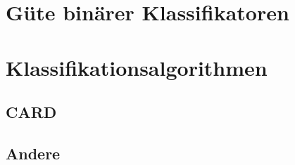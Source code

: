 \section{Güte binärer Klassifikatoren}
\section{Klassifikationsalgorithmen}
\subsection{CARD}
\subsection{Andere}